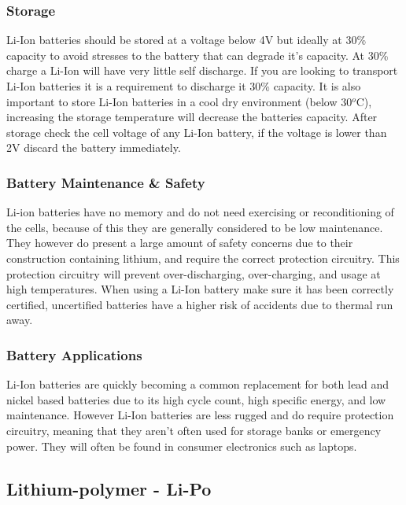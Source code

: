 \documentclass[a4paper,11pt]{article}
\begin{document}
\begin{multicols}{2}
\subsubsection{Storage}
\label{Li-ion storage}

Li-Ion batteries should be stored at a voltage below 4V but ideally at 30\% capacity to avoid stresses to the battery that can degrade it's capacity. At 30\% charge a Li-Ion will have very little self discharge. If you are looking to transport Li-Ion batteries it is a requirement to discharge it 30\% capacity. It is also important to store Li-Ion batteries in a cool dry environment (below 30$^o$C), increasing the storage temperature will decrease the batteries capacity. After storage check the cell voltage of any Li-Ion battery, if the voltage is lower than 2V discard the battery immediately.

\subsubsection{Battery Maintenance \& Safety}
\label{Li-ion safety}

Li-ion batteries have no memory and do not need exercising or reconditioning of the cells, because of this they are generally considered to be low maintenance. They however do present a large amount of safety concerns due to their construction containing lithium, and require the correct protection circuitry. This protection circuitry will prevent over-discharging, over-charging, and usage at high temperatures. When using a Li-Ion battery make sure it has been correctly certified, uncertified batteries have a higher risk of accidents due to thermal run away. 

\subsubsection{Battery Applications}

Li-Ion batteries are quickly becoming a common replacement for both lead and nickel based batteries due to its high cycle count, high specific energy, and low maintenance. However Li-Ion batteries are less rugged and do require protection circuitry, meaning that they aren't often used for storage banks or emergency power. They will often be found in consumer electronics such as laptops. 

\subsection{Lithium-polymer - Li-Po}


\end{multicols}
\end{document}

